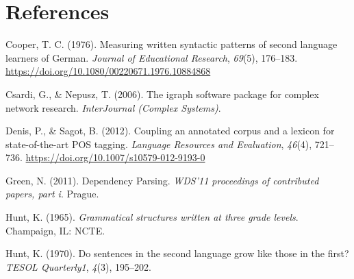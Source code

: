 \documentclass[
]{article}
\newenvironment{Shaded}{\begin{snugshade}}{\end{snugshade}}
\newcommand{\CommentTok}[1]{\textcolor[rgb]{0.56,0.35,0.01}{\textit{#1}}}
\newcommand{\KeywordTok}[1]{\textcolor[rgb]{0.13,0.29,0.53}{\textbf{#1}}}
\newcommand{\NormalTok}[1]{#1}
\begin{document}
\begin{Shaded}
\end{Shaded}

\hypertarget{references}{%
\section*{References}\label{references}}

\hypertarget{refs}{}
\leavevmode\hypertarget{ref-Cooper1976}{}%
Cooper, T. C. (1976). Measuring written syntactic patterns of second
language learners of German. \emph{Journal of Educational Research},
\emph{69}(5), 176--183.
\url{https://doi.org/10.1080/00220671.1976.10884868}

\leavevmode\hypertarget{ref-Csardi2006}{}%
Csardi, G., \& Nepusz, T. (2006). The igraph software package for
complex network research. \emph{InterJournal (Complex Systems)}.

\leavevmode\hypertarget{ref-Denis2012}{}%
Denis, P., \& Sagot, B. (2012). Coupling an annotated corpus and a
lexicon for state-of-the-art POS tagging. \emph{Language Resources and
Evaluation}, \emph{46}(4), 721--736.
\url{https://doi.org/10.1007/s10579-012-9193-0}

\leavevmode\hypertarget{ref-Green2011}{}%
Green, N. (2011). Dependency Parsing. \emph{WDS'11 proceedings of
contributed papers, part i}. Prague.

\leavevmode\hypertarget{ref-Hunt1965}{}%
Hunt, K. (1965). \emph{Grammatical structures written at three grade
levels}. Champaign, IL: NCTE.

\leavevmode\hypertarget{ref-Hunt1970}{}%
Hunt, K. (1970). Do sentences in the second language grow like those in
the first? \emph{TESOL Quarterly1}, \emph{4}(3), 195--202.
\end{document}
